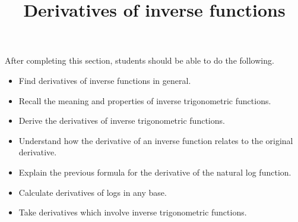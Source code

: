 \documentclass{ximera}
\title{Derivatives of inverse functions}
\begin{document}
\begin{abstract}
\end{abstract}

\maketitle

\begin{sectionOutcomes}

After completing this section, students should be able to do the following.

\begin{itemize}
	\item Find derivatives of inverse functions in general.
	\item Recall the meaning and properties of inverse trigonometric functions.
	\item Derive the derivatives of inverse trigonometric functions.
	\item Understand how the derivative of an inverse function relates to the original derivative.
	\item Explain the previous formula for the derivative of the natural log function.
	\item Calculate derivatives of logs in any base.
	\item Take derivatives which involve inverse trigonometric functions.
\end{itemize}

\end{sectionOutcomes}
\end{document}
